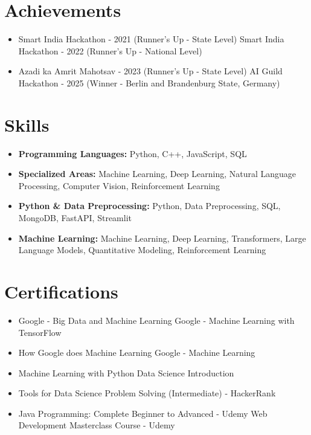 \documentclass[a4paper,10pt]{article}
\begin{document}
\section*{Achievements}
\begin{itemize}
\item Smart India Hackathon - 2021 (Runner's Up - State Level) \hfill Smart India Hackathon - 2022 (Runner's Up - National Level)
\item Azadi ka Amrit Mahotsav - 2023 (Runner's Up - State Level) \hfill AI Guild Hackathon - 2025 (Winner - Berlin and Brandenburg State, Germany)
\end{itemize}

\section*{Skills}
\begin{itemize}
  \item \textbf{Programming Languages:} Python, C++, JavaScript, SQL
  \item \textbf{Specialized Areas:} Machine Learning, Deep Learning, Natural Language Processing, Computer Vision, Reinforcement Learning
  \item \textbf{Python \& Data Preprocessing:} Python, Data Preprocessing, SQL, MongoDB, FastAPI, Streamlit
  \item \textbf{Machine Learning:} Machine Learning, Deep Learning, Transformers, Large Language Models, Quantitative Modeling, Reinforcement Learning
\end{itemize}

\section*{Certifications}
\begin{itemize}
\item Google - Big Data and Machine Learning \hfill Google - Machine Learning with TensorFlow
\item How Google does Machine Learning \hfill Google - Machine Learning
\item Machine Learning with Python \hfill Data Science Introduction
\item Tools for Data Science \hfill Problem Solving (Intermediate) - HackerRank
\item Java Programming: Complete Beginner to Advanced - Udemy \hfill Web Development Masterclass Course - Udemy
\end{itemize}
\end{document}
